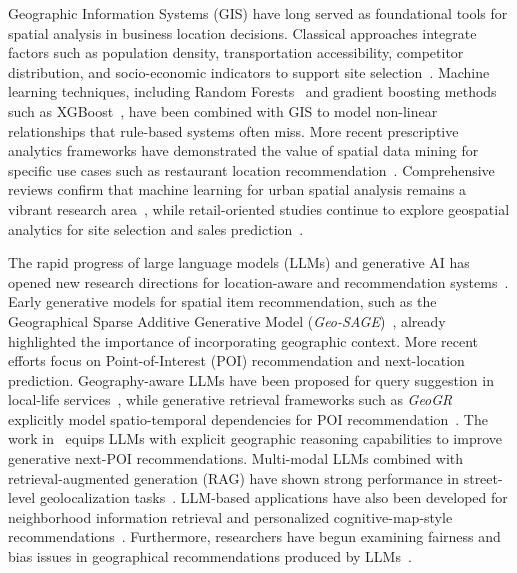 \documentclass[pdflatex,sn-mathphys-num]{sn-jnl}%
\theoremstyle{thmstyleone}%
\theoremstyle{thmstyletwo}%
\theoremstyle{thmstylethree}%
\begin{document}
Geographic Information Systems (GIS) have long served as foundational tools for spatial analysis in business location decisions. Classical approaches integrate factors such as population density, transportation accessibility, competitor distribution, and socio-economic indicators to support site selection~\cite{oliveira2024, pavani2024, manika2021}. 
Machine learning techniques, including Random Forests~\cite{breiman2001} and gradient boosting methods such as XGBoost~\cite{chen2016}, have been combined with GIS to model non-linear relationships that rule-based systems often miss. 
More recent prescriptive analytics frameworks have demonstrated the value of spatial data mining for specific use cases such as restaurant location recommendation~\cite{han2024}. 
Comprehensive reviews confirm that machine learning for urban spatial analysis remains a vibrant research area~\cite{Casali2022MLUrbanSpatial}, while retail-oriented studies continue to explore geospatial analytics for site selection and sales prediction~\cite{Ting2018GeospatialRetail}.

The rapid progress of large language models (LLMs) and generative AI has opened new research directions for location-aware and recommendation systems~\cite{alhasan2024}. 
Early generative models for spatial item recommendation, such as the Geographical Sparse Additive Generative Model (\textit{Geo-SAGE})~\cite{GeoSAGE}, already highlighted the importance of incorporating geographic context. More recent efforts focus on Point-of-Interest (POI) recommendation and next-location prediction. Geography-aware LLMs have been proposed for query suggestion in local-life services~\cite{LocalSUG}, while generative retrieval frameworks such as \textit{GeoGR} explicitly model spatio-temporal dependencies for POI recommendation~\cite{GeoGR}. 
The work in~\cite{ReasoningOverSpace} equips LLMs with explicit geographic reasoning capabilities to improve generative next-POI recommendations. Multi-modal LLMs combined with retrieval-augmented generation (RAG) have shown strong performance in street-level geolocalization tasks~\cite{StreetLevelGeolocal}. LLM-based applications have also been developed for neighborhood information retrieval and personalized cognitive-map-style recommendations~\cite{AskNearby}. Furthermore, researchers have begun examining fairness and bias issues in geographical recommendations produced by LLMs~\cite{UnequalOpportunities}.
\end{document}
